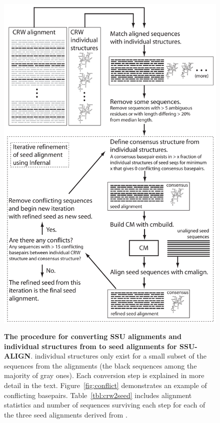 \begin{figure}
  \begin{center}
\includegraphics[height=6.9in]{Figures/crw2seed-schematic}
        \caption[The procedure for converting SSU alignments and
          individual structures from  to seed alignments for
          SSU-ALIGN.]  {\textbf{The procedure for converting
            SSU alignments and individual structures from  to seed
            alignments for SSU-ALIGN}.  individual structures
          only exist for a small subset of the sequences from the 
          alignments (the black sequences among the majority of gray
          ones). Each conversion step is explained
          in more detail in the text. 
          Figure~\ref{fig:conflict}
          demonstrates an example of conflicting basepairs. 
          Table~\ref{tbl:crw2seed} includes alignment
          statistics and number of sequences surviving each step for
          each of the three seed alignments derived from .}
  \end{center}
\label{fig:crw2seed}
\end{figure}

